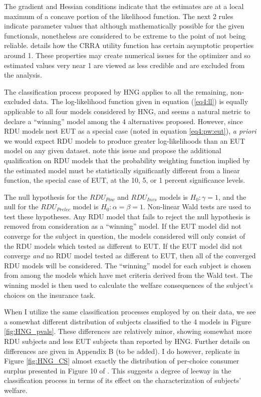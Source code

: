 \documentclass[../main.tex]{subfiles}
\begin{document}
\noindent The gradient and Hessian conditions indicate that the estimates are at a local maximum of a concave portion of the likelihood function.
The next 2 rules indicate parameter values that although mathematically possible for the given functionals, nonetheless are considered to be extreme to the point of not being reliable.
\textcite{Wakker2008} details how the CRRA utility function has certain asymptotic properties around 1.
These properties may create numerical issues for the optimizer and so estimated values very near 1 are viewed as less credible and are excluded from the analysis.

The classification process proposed by HNG applies to all the remaining, non-excluded data.
The log-likelihood function given in equation (\ref{eq4:ll}) is equally applicable to all four models considered by HNG, and seems a natural metric to declare a \enquote{winning} model among the 4 alternatives proposed.
However, since RDU models nest EUT as a special case (noted in equation \ref{eq4:pw:eut}), \textit{a priori} we would expect RDU models to produce greater log-likelihoods than an EUT model on any given dataset.
\textcite[102]{Harrison2016} note this issue and propose the additional qualification on RDU models that the probability weighting function implied by the estimated model must be statistically significantly different from a linear function, the special case of EUT, at the 10, 5, or 1 percent significance levels.

The null hypothesis for the $\mathit{RDU_{Pow}}$ and $\mathit{RDU_{Invs}}$ models is $H_0: \gamma = 1$, and the null for the $\mathit{RDU_{Prelec}}$ model is $H_0: \alpha = \beta = 1$.
Non-linear Wald tests are used to test these hypotheses.
Any RDU model that fails to reject the null hypothesis is removed from consideration as a \enquote{winning} model.
If the EUT model did not converge for the subject in question, the models considered will only consist of the RDU models which tested as different to EUT.
If the EUT model did not converge \textit{and} no RDU model tested as different to EUT, then all of the converged RDU models will be considered.
The \enquote{winning} model for each subject is chosen from among the models which have met criteria derived from the Wald test.
The winning model is then used to calculate the welfare consequences of the subject's choices on the insurance task.

When I utilize the same classification processes employed by \textcite{Harrison2016} on their data, we see a somewhat different distribution of subjects classified to the 4 models in Figure \ref{fig:HNG_pvals}.
These differences are relatively minor, showing somewhat more RDU subjects and less EUT subjects than reported by HNG.
Further details on differences are given in Appendix B (to be added).
I do however, replicate in Figure \ref{fig:HNG_CS} almost exactly the distribution of per-choice consumer surplus presented in Figure 10 of \textcite[108]{Harrison2016}.
This suggests a degree of leeway in the classification process in terms of its effect on the characterization of subjects' welfare.
\end{document}
